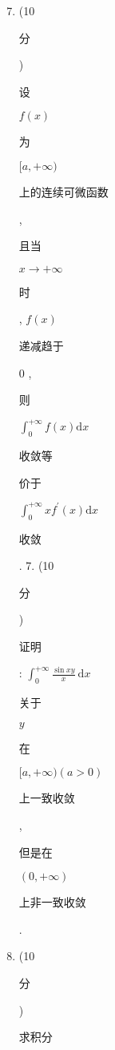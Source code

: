 \documentclass[10pt]{article}
\begin{document}
\begin{enumerate}
  \setcounter{enumi}{6}
  \item (10 \begin{CJK}{UTF8}{mj}分\end{CJK}) \begin{CJK}{UTF8}{mj}设\end{CJK} $f(x)$ \begin{CJK}{UTF8}{mj}为\end{CJK} $[a,+\infty)$ \begin{CJK}{UTF8}{mj}上的连续可微函数\end{CJK}, \begin{CJK}{UTF8}{mj}且当\end{CJK} $x \rightarrow+\infty$ \begin{CJK}{UTF8}{mj}时\end{CJK}, $f(x)$ \begin{CJK}{UTF8}{mj}递减趋于\end{CJK} 0 , \begin{CJK}{UTF8}{mj}则\end{CJK} $\int_{0}^{+\infty} f(x) \mathrm{d} x$ \begin{CJK}{UTF8}{mj}收敛等\end{CJK} \begin{CJK}{UTF8}{mj}价于\end{CJK} $\int_{0}^{+\infty} x f^{\prime}(x) \mathrm{d} x$ \begin{CJK}{UTF8}{mj}收敛\end{CJK}. 7. (10 \begin{CJK}{UTF8}{mj}分\end{CJK}) \begin{CJK}{UTF8}{mj}证明\end{CJK}: $\int_{0}^{+\infty} \frac{\sin x y}{x} \mathrm{~d} x$ \begin{CJK}{UTF8}{mj}关于\end{CJK} $y$ \begin{CJK}{UTF8}{mj}在\end{CJK} $[a,+\infty)(a>0)$ \begin{CJK}{UTF8}{mj}上一致收敛\end{CJK}, \begin{CJK}{UTF8}{mj}但是在\end{CJK} $(0,+\infty)$ \begin{CJK}{UTF8}{mj}上非一致收敛\end{CJK}.

  \item (10 \begin{CJK}{UTF8}{mj}分\end{CJK}) \begin{CJK}{UTF8}{mj}求积分\end{CJK}

\end{enumerate}
\end{document}
